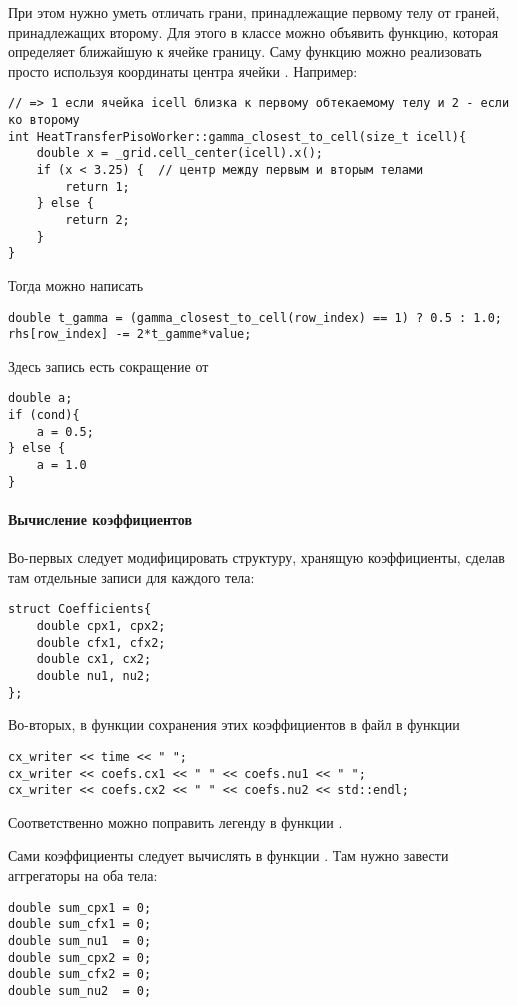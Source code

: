 При этом нужно уметь отличать грани, принадлежащие
первому телу от граней, принадлежащих второму.
Для этого в классе  можно
объявить функцию, которая определяет ближайшую к ячейке границу.
Саму функцию можно реализовать просто используя координаты
центра ячейки . Например:
\begin{verbatim}
// => 1 если ячейка icell близка к первому обтекаемому телу и 2 - если ко второму
int HeatTransferPisoWorker::gamma_closest_to_cell(size_t icell){
	double x = _grid.cell_center(icell).x();
	if (x < 3.25) {  // центр между первым и вторым телами
		return 1;
	} else {
		return 2;
	}
}
\end{verbatim}
Тогда можно написать
\begin{verbatim}
double t_gamma = (gamma_closest_to_cell(row_index) == 1) ? 0.5 : 1.0;
rhs[row_index] -= 2*t_gamme*value;
\end{verbatim}
Здесь запись  есть сокращение от

\begin{verbatim}
double a;
if (cond){
	a = 0.5;
} else {
	a = 1.0
}
\end{verbatim}

\paragraph{Вычисление коэффициентов}
Во-первых следует модифицировать структуру, хранящую коэффициенты,
сделав там отдельные записи для каждого тела:
\begin{verbatim}
struct Coefficients{
	double cpx1, cpx2;
	double cfx1, cfx2;
	double cx1, cx2;
	double nu1, nu2;
};
\end{verbatim}
Во-вторых, в функции сохранения этих коэффициентов в файл
в функции 
\begin{verbatim}
cx_writer << time << " ";
cx_writer << coefs.cx1 << " " << coefs.nu1 << " ";
cx_writer << coefs.cx2 << " " << coefs.nu2 << std::endl;
\end{verbatim}
Соответственно можно поправить легенду в функции .

Сами коэффициенты следует вычислять в функции .
Там нужно завести аггрегаторы на оба тела:
\begin{verbatim}
double sum_cpx1 = 0;
double sum_cfx1 = 0;
double sum_nu1  = 0;
double sum_cpx2 = 0;
double sum_cfx2 = 0;
double sum_nu2  = 0;
\end{verbatim}

